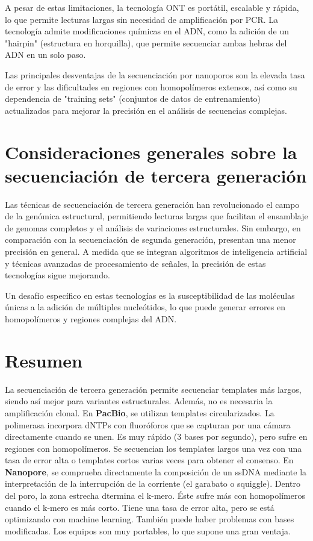 A pesar de estas limitaciones, la tecnología ONT es portátil, escalable y rápida, lo que permite lecturas largas sin necesidad de amplificación por PCR. La tecnología admite modificaciones químicas en el ADN, como la adición de un "hairpin" (estructura en horquilla), que permite secuenciar ambas hebras del ADN en un solo paso.

Las principales desventajas de la secuenciación por nanoporos son la elevada tasa de error y las dificultades en regiones con homopolímeros extensos, así como su dependencia de "training sets" (conjuntos de datos de entrenamiento) actualizados para mejorar la precisión en el análisis de secuencias complejas.

\section{Consideraciones generales sobre la secuenciación de tercera generación}
Las técnicas de secuenciación de tercera generación han revolucionado el campo de la genómica estructural, permitiendo lecturas largas que facilitan el ensamblaje de genomas completos y el análisis de variaciones estructurales. Sin embargo, en comparación con la secuenciación de segunda generación, presentan una menor precisión en general. A medida que se integran algoritmos de inteligencia artificial y técnicas avanzadas de procesamiento de señales, la precisión de estas tecnologías sigue mejorando.

Un desafío específico en estas tecnologías es la susceptibilidad de las moléculas únicas a la adición de múltiples nucleótidos, lo que puede generar errores en homopolímeros y regiones complejas del ADN.

\section{Resumen}
La secuenciación de tercera generación permite secuenciar templates más largos, siendo así mejor para variantes estructurales. Además, no es necesaria la amplificación clonal. En \textbf{PacBio}, se utilizan templates circularizados. La polimerasa incorpora dNTPs con fluoróforos que se capturan por una cámara directamente cuando se unen. Es muy rápido (3 bases por segundo), pero sufre en regiones con homopolímeros. Se secuencian los templates largos una vez con una tasa de error alta o templates cortos varias veces para obtener el consenso. En \textbf{Nanopore}, se comprueba directamente la composición de un ssDNA mediante la interpretación de la interrupción de la corriente (el garabato o squiggle). Dentro del poro, la zona estrecha dtermina el k-mero. Éste sufre más con homopolímeros cuando el k-mero es más corto. Tiene una tasa de error alta, pero se está optimizando con machine learning. También puede haber problemas con bases modificadas. Los equipos son muy portables, lo que supone una gran ventaja.

